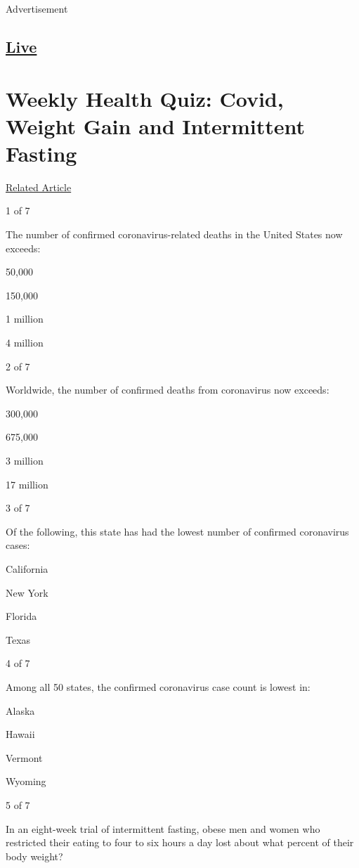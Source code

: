 Advertisement

\hypertarget{-live-}{%
\subsection{\texorpdfstring{
\href{https://www.nytimes.com/section/well/live}{Live}
}{ Live }}\label{-live-}}

\hypertarget{weekly-health-quiz-covid-weight-gain-and-intermittent-fasting}{%
\section{Weekly Health Quiz: Covid, Weight Gain and Intermittent
Fasting}\label{weekly-health-quiz-covid-weight-gain-and-intermittent-fasting}}

\href{https://www.nytimes.com/interactive/2020/07/24/well/live/24healthquiz-07242020.html}{Related
Article}

1 of 7

The number of confirmed coronavirus-related deaths in the United States
now exceeds:

50,000

150,000

1 million

4 million

2 of 7

Worldwide, the number of confirmed deaths from coronavirus now exceeds:

300,000

675,000

3 million

17 million

3 of 7

Of the following, this state has had the lowest number of confirmed
coronavirus cases:

California

New York

Florida

Texas

4 of 7

Among all 50 states, the confirmed coronavirus case count is lowest in:

Alaska

Hawaii

Vermont

Wyoming

5 of 7

In an eight-week trial of intermittent fasting, obese men and women who
restricted their eating to four to six hours a day lost about what
percent of their body weight?

